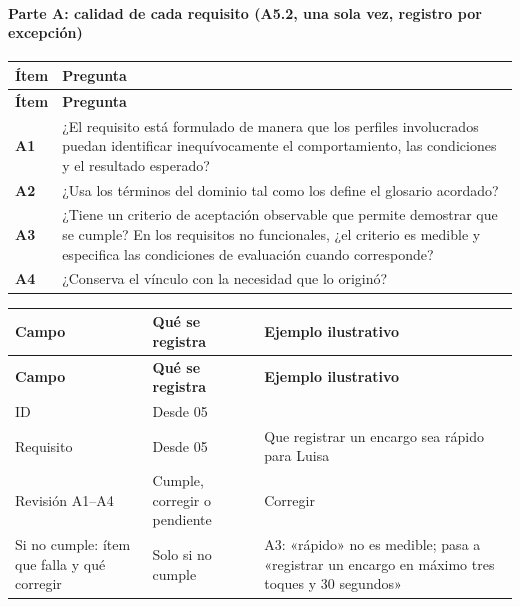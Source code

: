 \documentclass[12pt,letterpaper,oneside]{report}
\begin{document}
\paragraph{Parte A: calidad de cada requisito (A5.2, una sola vez, registro por excepción)}
{\scriptsize\renewcommand{\arraystretch}{1.25}\setlength{\tabcolsep}{3pt}
\begin{xltabular}{\textwidth}{@{}>{\raggedright\arraybackslash}p{0.07\textwidth}>{\raggedright\arraybackslash}X@{}}
\toprule
\textbf{Ítem} & \textbf{Pregunta} \\
\midrule
\endfirsthead
\toprule
\textbf{Ítem} & \textbf{Pregunta} \\
\midrule
\endhead
\bottomrule
\endlastfoot
\textbf{A1} & ¿El requisito está formulado de manera que los perfiles involucrados puedan identificar inequívocamente el comportamiento, las condiciones y el resultado esperado? \\
\textbf{A2} & ¿Usa los términos del dominio tal como los define el glosario acordado? \\
\textbf{A3} & ¿Tiene un criterio de aceptación observable que permite demostrar que se cumple? En los requisitos no funcionales, ¿el criterio es medible y especifica las condiciones de evaluación cuando corresponde? \\
\textbf{A4} & ¿Conserva el vínculo con la necesidad que lo originó? \\
\end{xltabular}}

{\scriptsize\renewcommand{\arraystretch}{1.25}\setlength{\tabcolsep}{3pt}
\begin{xltabular}{\textwidth}{@{}>{\raggedright\arraybackslash}p{0.25\textwidth}>{\raggedright\arraybackslash}X>{\raggedright\arraybackslash}p{0.30\textwidth}@{}}
\toprule
\textbf{Campo} & \textbf{Qué se registra} & \textbf{Ejemplo ilustrativo} \\
\midrule
\endfirsthead
\toprule
\textbf{Campo} & \textbf{Qué se registra} & \textbf{Ejemplo ilustrativo} \\
\midrule
\endhead
\bottomrule
\endlastfoot
{}ID & Desde 05 &  \\
Requisito & Desde 05 & Que registrar un encargo sea rápido para Luisa \\
Revisión A1–A4 & Cumple, corregir o pendiente & Corregir \\
Si no cumple: ítem que falla y qué corregir & Solo si no cumple & A3: «rápido» no es medible; pasa a «registrar un encargo en máximo tres toques y 30 segundos» \\
\end{xltabular}}
\end{document}

